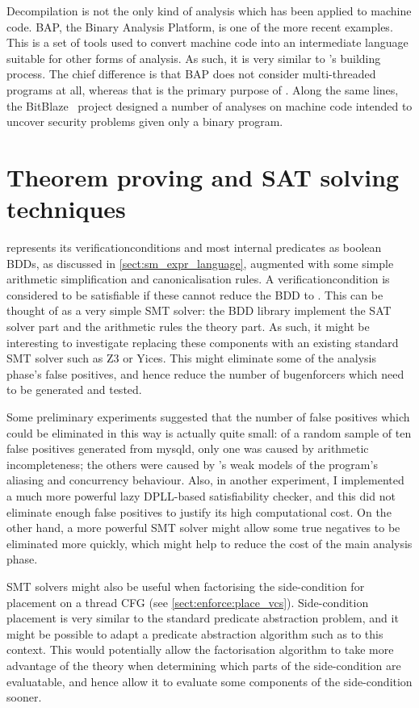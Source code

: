 Decompilation is not the only kind of analysis which has been applied
to machine code.  BAP, the Binary Analysis Platform\cite{Brumley2011},
is one of the more recent examples.  This is a set of tools used to
convert machine code into an intermediate language suitable for other
forms of analysis.  As such, it is very similar to {\technique}'s
{\StateMachine} building process.  The chief difference is that BAP
does not consider multi-threaded programs at all, whereas that is the
primary purpose of {\StateMachine}.  Along the same lines, the
BitBlaze~\cite{Song2008} project designed a number of analyses on
machine code intended to uncover security problems given only a binary
program.

\section{Theorem proving and SAT solving techniques}

{\Technique} represents its \glspl{verificationcondition} and most
internal predicates as boolean BDDs, as discussed in
\autoref{sect:sm_expr_language}, augmented with some simple arithmetic
simplification and canonicalisation rules.  A
\gls{verificationcondition} is considered to be satisfiable if these
cannot reduce the BDD to \false.  This can be thought of as a very
simple SMT solver\cite{Barrett2009}: the BDD library implement the SAT
solver part and the arithmetic rules the theory part.  As such, it
might be interesting to investigate replacing these components with an
existing standard SMT solver such as Z3\cite{Moura2008} or
Yices\cite{Dutertre2006}.  This might eliminate some of the analysis
phase's false positives, and hence reduce the number of
\glspl{bugenforcer} which need to be generated and tested.

Some preliminary experiments suggested that the number of false
positives which could be eliminated in this way is actually quite
small: of a random sample of ten false positives generated from
mysqld, only one was caused by arithmetic incompleteness; the others
were caused by {\technique}'s weak models of the program's aliasing
and concurrency behaviour.  Also, in another experiment, I implemented
a much more powerful lazy DPLL-based satisfiability
checker\cite{Davis1962}, and this did not eliminate enough false
positives to justify its high computational cost.  On the other hand,
a more powerful SMT solver might allow some true negatives to be
eliminated more quickly, which might help to reduce the cost of the
main analysis phase.

SMT solvers might also be useful when factorising the side-condition
for placement on a thread CFG (see \autoref{sect:enforce:place_vcs}).
Side-condition placement is very similar to the standard predicate
abstraction problem\cite{Graf1997}, and it might be possible to adapt
a predicate abstraction algorithm such as \cite{Lahiri2006} to this
context.  This would potentially allow the factorisation algorithm to
take more advantage of the theory when determining which parts of the
side-condition are evaluatable, and hence allow it to evaluate some
components of the side-condition sooner.
